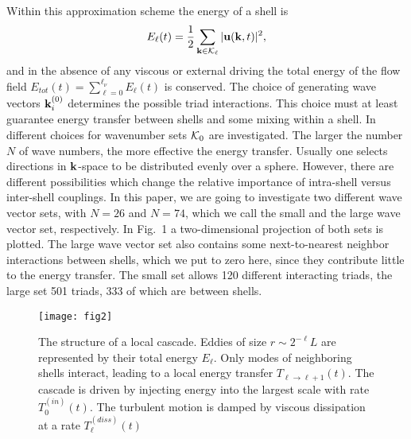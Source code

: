 \documentclass[dc]{svjour}
\begin{document}

Within this approximation scheme the energy of a shell is
\begin{equation}
  \label{energy}
  E_{\ell}(t)=\frac{1}{2}\sum_{{\bf k}\in{\cal K}_{\ell}} |{\bf u}({\bf
    k},t)|^{2},
\end{equation}
and in the  absence of any viscous or external driving the
total energy of the flow field
$E_{tot}(t)=\sum_{\ell=0}^{\ell_{\nu}} E_{\ell}(t)$ is conserved.
The choice of generating wave vectors ${\bf k}^{(0)}_i$ determines
the possible triad interactions. This choice must at least guarantee
energy transfer between shells and some mixing within a shell. In
\cite{eggers91a,grossmann94a} different choices for
wavenumber sets ${\cal K}_0$ are investigated. The larger the number
$N$ of wave numbers, the more effective the energy transfer. Usually
one selects directions in ${\bf k}$-space to be distributed evenly
over a sphere. However, there are different possibilities which
change the relative importance of intra-shell versus inter-shell
couplings. In this paper, we are going to investigate two different
wave vector sets, with $N=26$ and $N=74$, which we call the small and the
large wave vector set, respectively. In Fig.~1 a two-dimensional
projection of both sets is plotted. The large wave vector set also
contains some next-to-nearest neighbor interactions between shells,
which we put to zero here, since they contribute little to the
energy transfer. The small set allows 120 different interacting triads,
the large set 501 triads, 333 of which are between shells.

\begin{figure}%
\sidecaption
\texttt{[image: fig2]}
  \caption{The structure of a local cascade.
    Eddies of size $r\sim 2^{-\ell}L$ are
    represented by their total energy $E_{\ell}$.
    Only modes of
    neighboring shells interact, leading to a local energy
    transfer $T_{\ell\rightarrow\ell+1}(t)$. The cascade is driven by
    injecting energy into the largest scale with rate
    $T_{0}^{(in)}(t)$. The turbulent motion is damped by viscous dissipation
    at a rate
    $T_{\ell}^{(diss)}(t)$
    }
  \label{fig:modelstructure}
\end{figure}
\end{document}
